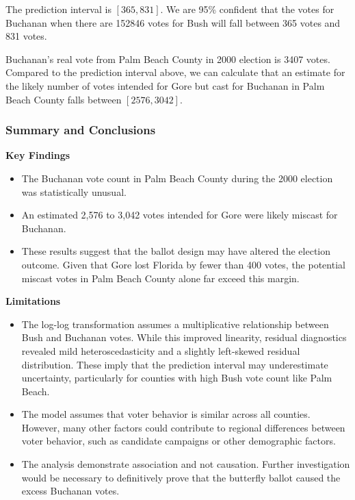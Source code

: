 \documentclass[
  letterpaper,
  DIV=11,
  numbers=noendperiod]{scrartcl}
\begin{document}
The prediction interval is \([365, 831]\). We are 95\% confident that
the votes for Buchanan when there are 152846 votes for Bush will fall
between 365 votes and 831 votes.

Buchanan's real vote from Palm Beach County in 2000 election is 3407
votes. Compared to the prediction interval above, we can calculate that
an estimate for the likely number of votes intended for Gore but cast
for Buchanan in Palm Beach County falls between \([2576, 3042]\).

\subsubsection{Summary and Conclusions}\label{summary-and-conclusions}

\textbf{Key Findings}

\begin{itemize}
\item
  The Buchanan vote count in Palm Beach County during the 2000 election
  was statistically unusual.
\item
  An estimated 2,576 to 3,042 votes intended for Gore were likely
  miscast for Buchanan.
\item
  These results suggest that the ballot design may have altered the
  election outcome. Given that Gore lost Florida by fewer than 400
  votes, the potential miscast votes in Palm Beach County alone far
  exceed this margin.
\end{itemize}

\textbf{Limitations}

\begin{itemize}
\item
  The log-log transformation assumes a multiplicative relationship
  between Bush and Buchanan votes. While this improved linearity,
  residual diagnostics revealed mild heteroscedasticity and a slightly
  left-skewed residual distribution. These imply that the prediction
  interval may underestimate uncertainty, particularly for counties with
  high Bush vote count like Palm Beach.
\item
  The model assumes that voter behavior is similar across all counties.
  However, many other factors could contribute to regional differences
  between voter behavior, such as candidate campaigns or other
  demographic factors.
\item
  The analysis demonstrate association and not causation. Further
  investigation would be necessary to definitively prove that the
  butterfly ballot caused the excess Buchanan votes.
\end{itemize}
\end{document}

